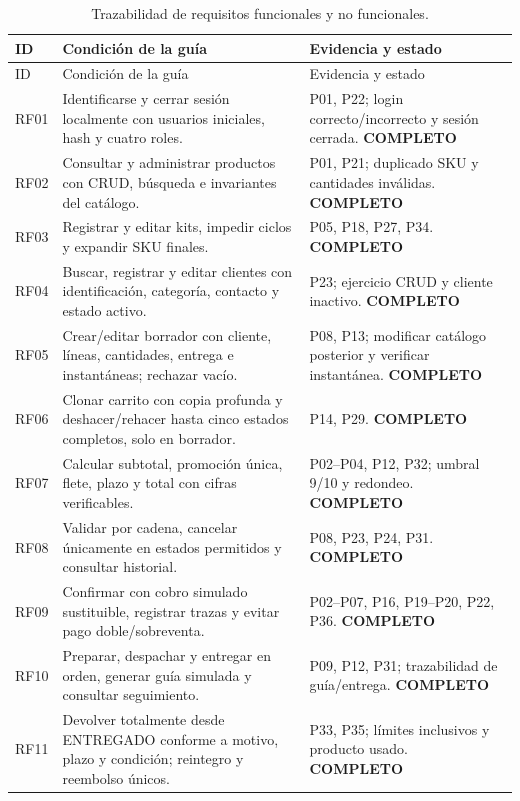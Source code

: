 \small
\begin{longtable}{@{}L{.09\linewidth}L{.47\linewidth}L{.35\linewidth}@{}}
\caption{Trazabilidad de requisitos funcionales y no funcionales.}\\
\toprule ID & Condición de la guía & Evidencia y estado \\ \midrule\endfirsthead
\toprule ID & Condición de la guía & Evidencia y estado \\ \midrule\endhead
RF01 & Identificarse y cerrar sesión localmente con usuarios iniciales, hash y cuatro roles. & P01, P22; login correcto/incorrecto y sesión cerrada. \textbf{COMPLETO} \\[2pt]
RF02 & Consultar y administrar productos con CRUD, búsqueda e invariantes del catálogo. & P01, P21; duplicado SKU y cantidades inválidas. \textbf{COMPLETO} \\[2pt]
RF03 & Registrar y editar kits, impedir ciclos y expandir SKU finales. & P05, P18, P27, P34. \textbf{COMPLETO} \\[2pt]
RF04 & Buscar, registrar y editar clientes con identificación, categoría, contacto y estado activo. & P23; ejercicio CRUD y cliente inactivo. \textbf{COMPLETO} \\[2pt]
RF05 & Crear/editar borrador con cliente, líneas, cantidades, entrega e instantáneas; rechazar vacío. & P08, P13; modificar catálogo posterior y verificar instantánea. \textbf{COMPLETO} \\[2pt]
RF06 & Clonar carrito con copia profunda y deshacer/rehacer hasta cinco estados completos, solo en borrador. & P14, P29. \textbf{COMPLETO} \\[2pt]
RF07 & Calcular subtotal, promoción única, flete, plazo y total con cifras verificables. & P02–P04, P12, P32; umbral 9/10 y redondeo. \textbf{COMPLETO} \\[2pt]
RF08 & Validar por cadena, cancelar únicamente en estados permitidos y consultar historial. & P08, P23, P24, P31. \textbf{COMPLETO} \\[2pt]
RF09 & Confirmar con cobro simulado sustituible, registrar trazas y evitar pago doble/sobreventa. & P02–P07, P16, P19–P20, P22, P36. \textbf{COMPLETO} \\[2pt]
RF10 & Preparar, despachar y entregar en orden, generar guía simulada y consultar seguimiento. & P09, P12, P31; trazabilidad de guía/entrega. \textbf{COMPLETO} \\[2pt]
RF11 & Devolver totalmente desde ENTREGADO conforme a motivo, plazo y condición; reintegro y reembolso únicos. & P33, P35; límites inclusivos y producto usado. \textbf{COMPLETO} \\[2pt]

\end{longtable}
